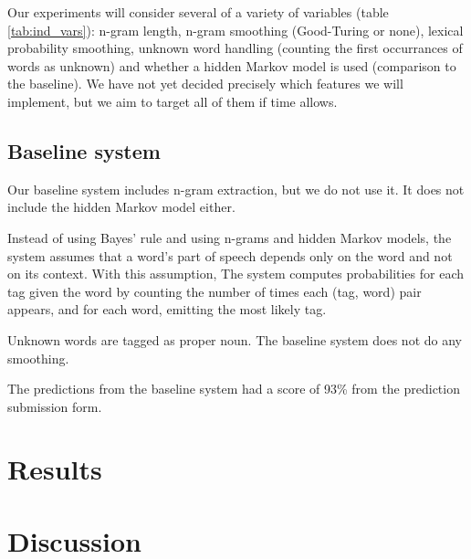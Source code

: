 \documentclass{article}
\begin{document}
Our experiments will consider several of a variety of variables (table \ref{tab:ind_vars}): n-gram length,
n-gram smoothing (Good-Turing or none), lexical probability smoothing, unknown
word handling (counting the first occurrances of words as unknown) and
whether a hidden Markov model is used (comparison to the baseline).
We have not yet decided precisely which features we will implement, but we
aim to target all of them if time allows.

\subsection{Baseline system}
Our baseline system includes n-gram extraction,
but we do not use it.
It does not include the hidden Markov model either.

Instead of using Bayes' rule and using n-grams and hidden Markov models,
the system assumes that a word's part of speech depends only
on the word and not on its context. With this assumption,
The system computes probabilities for each tag given the word by counting the
number of times each (tag, word) pair appears, and for each word, emitting the
most likely tag.

Unknown words are tagged as proper noun.
The baseline system does not do any smoothing.

The predictions from the baseline system had a score of 93\%
from the prediction submission form.

\section{Results}


\section{Discussion}
\end{document}
